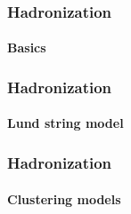 \documentclass[aspectratio=43]{beamer}
\begin{document}
\begin{frame}
	
	\frametitle{Hadronization}
	\framesubtitle{Basics}

\end{frame}

\begin{frame}
	
	\frametitle{Hadronization}
	\framesubtitle{Lund string model}

\end{frame}

\begin{frame}
	
	\frametitle{Hadronization}
	\framesubtitle{Clustering models}

\end{frame}
\end{document}
